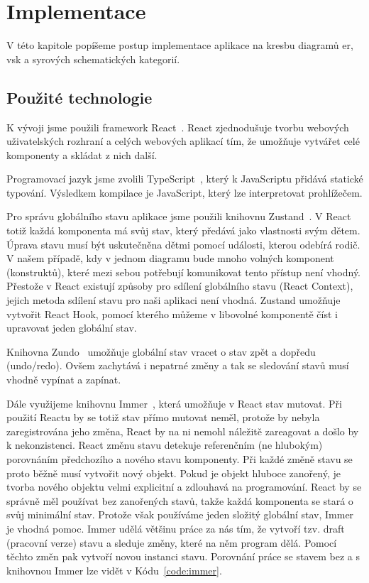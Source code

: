 \chapter{Implementace}

V této kapitole popíšeme postup implementace aplikace na kresbu diagramů \acrfull{er}, \acrfull{vsk} a syrových schematických kategorií.

\section{Použité technologie}

K vývoji jsme použili framework React~\cite{react_2023}.
React zjednodušuje tvorbu webových uživatelských rozhraní a celých webových aplikací tím, že umožňuje vytvářet celé komponenty a skládat z nich další.

Programovací jazyk jsme zvolili TypeScript~\cite{microsoft_typescriptjavascript_2023}, který k JavaScriptu přidává statické typování.
Výsledkem kompilace je JavaScript, který lze interpretovat prohlížečem.

Pro správu globálního stavu aplikace jsme použili knihovnu Zustand~\cite{daishikato_zustand_2023}.
V React totiž každá komponenta má svůj stav, který předává jako vlastnosti svým dětem.
Úprava stavu musí být uskutečněna dětmi pomocí události, kterou odebírá rodič.
V našem případě, kdy v jednom diagramu bude mnoho volných komponent (konstruktů), které mezi sebou potřebují komunikovat tento přístup není vhodný.
Přestože v React existují způsoby pro sdílení globálního stavu (React Context), jejich metoda sdílení stavu pro naši aplikaci není vhodná.
Zustand umožňuje vytvořit React Hook, pomocí kterého můžeme v libovolné komponentě číst i upravovat jeden globální stav.

Knihovna Zundo~\cite{kornoelje_zundo_2023} umožňuje globální stav vracet o stav zpět a dopředu (undo/redo).
Ovšem zachytává i nepatrné změny a tak se sledování stavů musí vhodně vypínat a zapínat.

Dále využijeme knihovnu Immer~\cite{michelweststrate_immer_2023}, která umožňuje v React stav mutovat.
Při použití Reactu by se totiž stav přímo mutovat neměl, protože by nebyla zaregistrována jeho změna, React by na ni nemohl náležitě zareagovat a došlo by k nekonzistenci.
React změnu stavu detekuje referenčním (ne hlubokým) porovnáním předchozího a nového stavu komponenty.
Při každé změně stavu se proto běžně musí vytvořit nový objekt.
Pokud je objekt hluboce zanořený, je tvorba nového objektu velmi explicitní a zdlouhavá na programování.
React by se správně měl používat bez zanořených stavů, takže každá komponenta se stará o svůj minimální stav.
Protože však používáme jeden složitý globální stav, Immer je vhodná pomoc.
Immer udělá většinu práce za nás tím, že vytvoří tzv. draft (pracovní verze) stavu a sleduje změny, které na něm program dělá.
Pomocí těchto změn pak vytvoří novou instanci stavu.
Porovnání práce se stavem bez a s knihovnou Immer lze vidět v Kódu~\ref{code:immer}.

